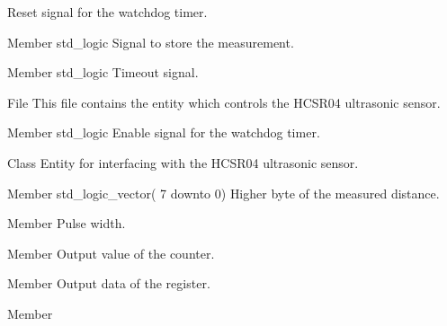 \begin{DoxyRefList}
%
 Reset signal for the watchdog timer.  
\item[Member \doxylink{classhcsr04__ctrl_ad9147cb1dd1d2bea129491a23c407f26}{hcsr04\+\_\+ctrl.store\+\_\+measurement} std\+\_\+logic ]\label{brief__brief000104}%
%
 Signal to store the measurement.  
\item[Member \doxylink{classhcsr04__ctrl_a5e775577baceffd3007625e67fa087ba}{hcsr04\+\_\+ctrl.timeout} std\+\_\+logic ]\label{brief__brief000101}%
%
 Timeout signal.  
\item[File \doxylink{hcsr04__ctrl_8vhdl}{hcsr04\+\_\+ctrl.vhdl} ]\label{brief__brief000094}%
%
 This file contains the  entity which controls the HCSR04 ultrasonic sensor.  
\item[Member \doxylink{classhcsr04__ctrl_aa4efab7a74eeea9c9d26d0a99c2ab49d}{hcsr04\+\_\+ctrl.watchdog\+\_\+en} std\+\_\+logic ]\label{brief__brief000105}%
%
 Enable signal for the watchdog timer.  
\item[Class \doxylink{classhcsr04__interface}{hcsr04\+\_\+interface} ]\label{brief__brief000110}%
%
 Entity for interfacing with the HCSR04 ultrasonic sensor.  
\item[Member \doxylink{classhcsr04__interface_a430c0ea27be353392423a03839bb3862}{hcsr04\+\_\+interface.dist\+\_\+h} std\+\_\+logic\+\_\+vector( 7 downto  0) ]\label{brief__brief000111}%
%
 Higher byte of the measured distance.  
\item[Member \doxylink{classhcsr04__interface_1_1rtl_a56e8055f97c4f280a519cc8361d119cc}{hcsr04\+\_\+interface.rtl.gerador\+\_\+pulso} ]\label{brief__brief000112}%
%
 Pulse width.  
\item[Member \doxylink{classhcsr04__interface_1_1rtl_abb1f4b1077fed42215491ace6164cf2c}{hcsr04\+\_\+interface.rtl.register\+\_\+d} ]\label{brief__brief000114}%
%
 Output value of the counter.  
\item[Member \doxylink{classhcsr04__interface_1_1rtl_abe5ea6dffb009dcf2f9eaeb4d8714846}{hcsr04\+\_\+interface.rtl.s\+\_\+half} ]\label{brief__brief000115}%
%
 Output data of the register.  
\item[Member \doxylink{classhcsr04__interface_1_1rtl_a91db294fcb9fcb66fc8d9ca0f821c4a6}{hcsr04\+\_\+interface.rtl.sync\+\_\+par\+\_\+counter} ]\label{brief__brief000113}%

\end{DoxyRefList}
